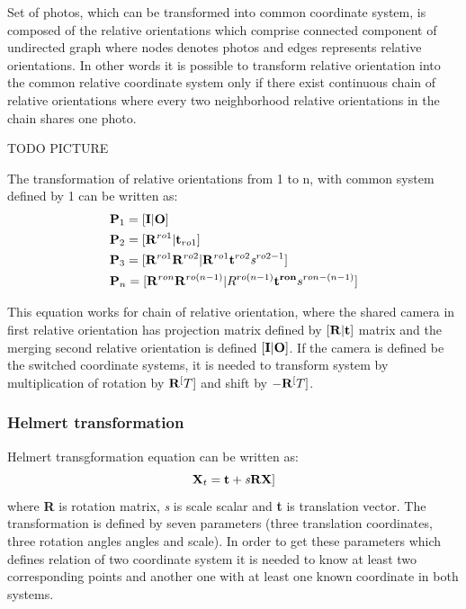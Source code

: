 \documentclass[a4paper,12pt]{report}
\newcommand{\ematr}[1]{
{\bf #1}
}
\newcommand{\evect}[1]{
{\bf #1}
}
\newcommand{\escal}[1]{
{\it #1}
}
\begin{document}
Set of photos, which can be transformed into common coordinate system, is composed of the relative orientations
which comprise connected component of undirected graph where nodes denotes photos and edges represents relative orientations. 
In other words it is possible to transform relative orientation into the common relative coordinate system only if there 
exist continuous chain of relative orientations where every two neighborhood relative orientations in the chain shares one photo.

TODO PICTURE

The transformation of relative orientations from 1 to n, with common system defined by 1 can be written as: 
\begin{equation}
\label{eq:comm_rel}
\begin{split}
&\ematr{P}_{1} = [\ematr{I}|\evect{O}] \\
&\ematr{P}_{2} = [\ematr{R}^{ro1}|\evect{t}_{ro1}] \\
&\ematr{P}_{3} = [\ematr{R}^{ro1} \ematr{R}^{ro2}| \ematr{R}^{ro1} \evect{t}^{ro2} \escal{s}^{ro2-1}] \\
&\ematr{P}_{n} = [\ematr{R}^{ron} \ematr{R}^{ro(n - 1)}| R^{ro(n - 1)} \evect{t^{ron}} {s}^{ron- (n-1)}] \\
\end{split}
\end{equation}


This equation works for chain of relative orientation, where the shared camera in first relative orientation has 
projection matrix defined by $[\ematr{R}|\evect{t}]$ matrix and the merging second relative orientation is 
defined $[\ematr{I}|\ematr{O}]$. If the camera is defined be the switched coordinate systems, it is needed to 
transform system by multiplication of rotation by $\ematr{R}^[T]$ and shift by $-\ematr{R}^[T]$.

\subsubsection{Helmert transformation}
\label{sec:helmert}

Helmert transgformation equation can be written as:
\begin{equation}
\ematr{X}_{t} = \evect{t} + \escal{s}\ematr{R}\evect{X}] \\
\end{equation}
where \ematr{R} is rotation matrix, \escal{s} is scale scalar and  \evect{t} is translation vector.
The transformation is defined by seven parameters (three translation coordinates, three rotation angles angles and scale).
In order to get these parameters which defines relation of two coordinate system it is needed to know at least two corresponding points and  another one with 
at least one known coordinate in both systems. 
\end{document}
